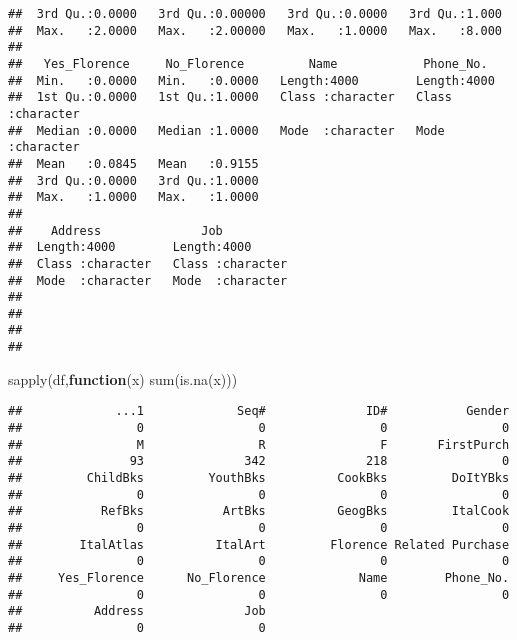\documentclass[
]{article}
\newenvironment{Shaded}{\begin{snugshade}}{\end{snugshade}}
\newcommand{\ControlFlowTok}[1]{\textcolor[rgb]{0.13,0.29,0.53}{\textbf{#1}}}
\newcommand{\FunctionTok}[1]{\textcolor[rgb]{0.00,0.00,0.00}{#1}}
\newcommand{\NormalTok}[1]{#1}
\begin{document}
\begin{verbatim}
##  3rd Qu.:0.0000   3rd Qu.:0.00000   3rd Qu.:0.0000   3rd Qu.:1.000   
##  Max.   :2.0000   Max.   :2.00000   Max.   :1.0000   Max.   :8.000   
##                                                                      
##   Yes_Florence     No_Florence         Name            Phone_No.        
##  Min.   :0.0000   Min.   :0.0000   Length:4000        Length:4000       
##  1st Qu.:0.0000   1st Qu.:1.0000   Class :character   Class :character  
##  Median :0.0000   Median :1.0000   Mode  :character   Mode  :character  
##  Mean   :0.0845   Mean   :0.9155                                        
##  3rd Qu.:0.0000   3rd Qu.:1.0000                                        
##  Max.   :1.0000   Max.   :1.0000                                        
##                                                                         
##    Address              Job           
##  Length:4000        Length:4000       
##  Class :character   Class :character  
##  Mode  :character   Mode  :character  
##                                       
##                                       
##                                       
## 
\end{verbatim}

\begin{Shaded}
\begin{Highlighting}[]
\FunctionTok{sapply}\NormalTok{(df,}\ControlFlowTok{function}\NormalTok{(x) }\FunctionTok{sum}\NormalTok{(}\FunctionTok{is.na}\NormalTok{(x)))}
\end{Highlighting}
\end{Shaded}

\begin{verbatim}
##             ...1             Seq#              ID#           Gender 
##                0                0                0                0 
##                M                R                F       FirstPurch 
##               93              342              218                0 
##         ChildBks         YouthBks          CookBks         DoItYBks 
##                0                0                0                0 
##           RefBks           ArtBks          GeogBks         ItalCook 
##                0                0                0                0 
##        ItalAtlas          ItalArt         Florence Related Purchase 
##                0                0                0                0 
##     Yes_Florence      No_Florence             Name        Phone_No. 
##                0                0                0                0 
##          Address              Job 
##                0                0
\end{verbatim}
\end{document}
